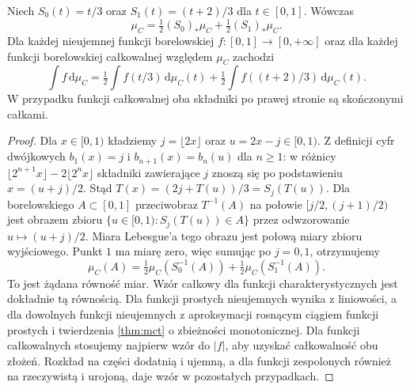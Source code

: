 \begin{twierdzenie}
\label{it:thm:cantor-selfsimilar-integrals}
Niech $S_0(t)=t/3$ oraz $S_1(t)=(t+2)/3$ dla $t\in[0,1]$.
Wówczas
\[
 \mu_C=\tfrac12(S_0)_*\mu_C+\tfrac12(S_1)_*\mu_C.
\]
Dla każdej nieujemnej funkcji borelowskiej $f:[0,1]\to[0,+\infty]$
oraz dla każdej funkcji borelowskiej całkowalnej względem
$\mu_C$ zachodzi
\[
 \int f\,\mathrm d\mu_C=
 \tfrac12\int f(t/3)\,\mathrm d\mu_C(t)
 +\tfrac12\int f((t+2)/3)\,\mathrm d\mu_C(t).
\]
W przypadku funkcji całkowalnej oba składniki po prawej
stronie są skończonymi całkami.
\end{twierdzenie}
\begin{proof}
Dla $x\in[0,1)$ kładziemy $j=\lfloor2x\rfloor$ oraz
$u=2x-j\in[0,1)$. Z definicji cyfr dwójkowych
$b_1(x)=j$ i $b_{n+1}(x)=b_n(u)$ dla $n\ge1$:
w różnicy
$\lfloor2^{n+1}x\rfloor-2\lfloor2^nx\rfloor$
składniki zawierające $j$ znoszą się po podstawieniu
$x=(u+j)/2$. Stąd
$T(x)=(2j+T(u))/3=S_j(T(u))$.
Dla borelowskiego $A\subset[0,1]$ przeciwobraz
$T^{-1}(A)$ na połowie $[j/2,(j+1)/2)$ jest obrazem
zbioru $\{u\in[0,1): S_j(T(u))\in A\}$ przez
odwzorowanie $u\mapsto(u+j)/2$. Miara Lebesgue'a
tego obrazu jest połową miary zbioru wyjściowego.
Punkt $1$ ma miarę zero, więc sumując po $j=0,1$,
otrzymujemy
\[
 \mu_C(A)=\tfrac12\mu_C(S_0^{-1}(A))
          +\tfrac12\mu_C(S_1^{-1}(A)).
\]
To jest żądana równość miar.
Wzór całkowy dla funkcji charakterystycznych jest
dokładnie tą równością. Dla funkcji prostych nieujemnych
wynika z liniowości, a dla dowolnych funkcji nieujemnych
z aproksymacji rosnącym ciągiem funkcji prostych i
twierdzenia \ref{thm:mct} o zbieżności monotonicznej.
Dla funkcji całkowalnych stosujemy najpierw wzór
do $|f|$, aby uzyskać całkowalność obu złożeń.
Rozkład na części dodatnią i ujemną, a dla funkcji
zespolonych również na rzeczywistą i urojoną,
daje wzór w pozostałych przypadkach.
\end{proof}

